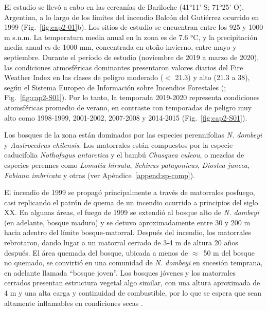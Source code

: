 El estudio se llevó a cabo en las cercanías de Bariloche (41°11' S; 71°25' O), Argentina, a lo largo de los límites del incendio Balcón del Gutiérrez ocurrido en 1999 (Fig.~\ref{fig:cap2-01}b). Los sitios de estudio se encuentran entre los 925 y 1000 m s.n.m. La temperatura media anual en la zona es de 7.6 °C, y la precipitación media anual es de 1000 mm, concentrada en otoño-invierno, entre mayo y septiembre. Durante el período de estudio (noviembre de 2019 a marzo de 2020), las condiciones atmosféricas dominantes presentaron valores diarios del Fire Weather Index \citep{van_wagner_development_1987} en las clases de peligro moderado ($<$ 21.3) y alto (21.3 a 38), según el Sistema Europeo de Información sobre Incendios Forestales (\citealt{san-miguel-ayanz_comprehensive_2012}; Fig.~\ref{fig:cap2-S01}). Por lo tanto, la temporada 2019-2020 representa condiciones atomsféricas promedio de verano, en contraste con temporadas de peligro muy alto como 1998-1999, 2001-2002, 2007-2008 y 2014-2015 (Fig.~\ref{fig:cap2-S01}).

Los bosques de la zona están dominados por las especies perennifolias \textit{N. dombeyi} y \textit{Austrocedrus chilensis}. Los matorrales están compuestos por la especie caducifolia \textit{Nothofagus antarctica} y el bambú \textit{Chusquea culeou}, o mezclas de especies perennes como \textit{Lomatia hirsuta}, \textit{Schinus patagonicus}, \textit{Diostea juncea}, \textit{Fabiana imbricata} y otras (ver Apéndice~\ref{append:sp-comp}).

El incendio de 1999 se propagó principalmente a través de matorrales posfuego, casi replicando el patrón de quema de un incendio ocurrido a principios del siglo XX. En algunas áreas, el fuego de 1999 se extendió al bosque alto de \textit{N. dombeyi} (en adelante, bosque maduro) y se detuvo aproximadamente entre 30 y 200 m hacia adentro del límite bosque-matorral. Después del incendio, los matorrales rebrotaron, dando lugar a un matorral cerrado de 3-4 m de altura 20 años después. El área quemada del bosque, ubicada a menos de $\approx$~50 m del bosque no quemado, se convirtió en una comunidad de \textit{N. dombeyi} en sucesión temprana, en adelante llamada ``bosque joven''. Los bosques jóvenes y los matorrales cerrados presentan estructura vegetal algo similar, con una altura aproximada de 4 m y una alta carga y continuidad de combustible, por lo que se espera que sean altamente inflamables en condiciones secas \citep{tiribelli_changes_2018}.

